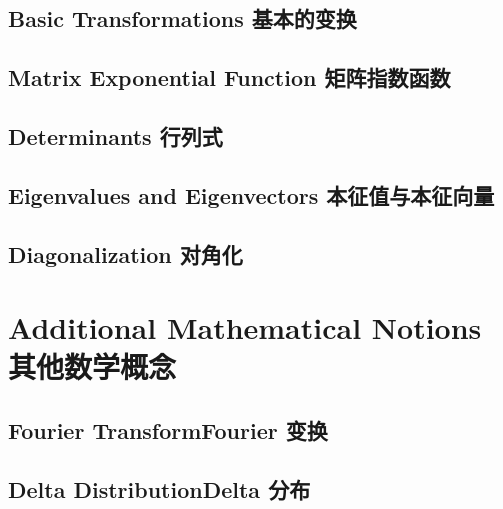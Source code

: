 \section[基本的变换]{Basic Transformations 基本的变换}
\section[矩阵指数函数]{Matrix Exponential Function 矩阵指数函数}
\section[行列式]{Determinants 行列式}
\section[本征值与本征向量]{Eigenvalues and Eigenvectors 本征值与本征向量}
\section[对角化]{Diagonalization 对角化}

\chapter[其他数学概念]{Additional Mathematical
Notions 其他数学概念}
\section[Fourier 变换]{Fourier Transform\quad Fourier 变换}
\section[Delta 分布]{Delta Distribution\quad Delta 分布}
